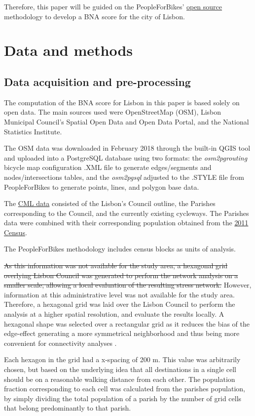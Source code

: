 \documentclass[information,article,submit,moreauthors,Latex,dvi2pdf,10pt,a4paper]{Definitions/mdpi}
\begin{document}
Therefore, this paper will be guided on the  PeopleForBikes’ \href{https://github.com/azavea/pfb-network-connectivity}{open source} methodology to develop a BNA score for the city of Lisbon.

\section{Data and methods} \label {methods}

\subsection{Data acquisition and pre-processing} \label{data}

The computation of the BNA score for Lisbon in this paper is based solely on open data. The main sources used were OpenStreetMap (OSM), Lisbon Municipal Council's Spatial Open Data and Open Data Portal, and the National Statistics Institute.

The OSM data was downloaded in February 2018 through the built-in QGIS tool and uploaded into a PostgreSQL database using two formats: the \textit{osm2pgrouting} bicycle map
configuration .XML file to generate edges/segments and nodes/intersections tables, and the \textit{osm2pgsql} adjusted to the .STYLE file from PeopleForBikes to generate points, lines, and polygon base data.

The \href{http://geodados.cm-lisboa.pt/}{CML data} consisted of the Lisbon's Council outline, the Parishes corresponding to the Council, and the currently existing cycleways. The Parishes data were combined with their corresponding population obtained from the \href{http://censos.ine.pt/}{2011 Census}.

The PeopleForBikes methodology includes census blocks as units of analysis.
\begin{mycolorbox}[colback=yellow]
\sout{As this information was not available for the study area, a hexagonal grid overlying Lisbon Council was generated to perform the network analysis on a smaller scale, allowing a local evaluation of the resulting stress network.} However, information at this administrative level was not available for the study area. Therefore, a hexagonal grid was laid over the Lisbon Council to perform the analysis at a higher spatial resolution, and evaluate the results locally. A hexagonal shape was selected over a rectangular grid as it reduces the bias of the edge-effect generating a more symmetrical neighborhood and thus being more convenient for connectivity analyses \cite{Birch2007}.
\end{mycolorbox}
Each hexagon in the grid had a x-spacing of 200 m. This value was arbitrarily chosen, but based on the underlying idea that all destinations in a single cell should be on a reasonable walking distance from each other. The population fraction corresponding to each cell was calculated from the parishes population, by simply dividing the total population of a parish by the number of grid cells that belong predominantly to that parish.
\end{document}
